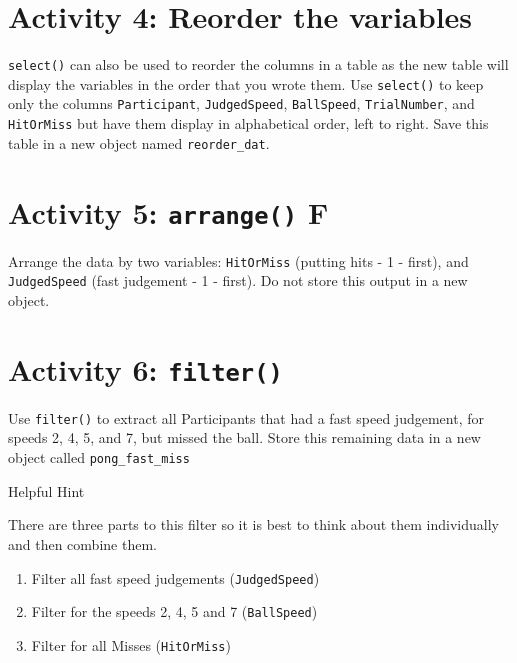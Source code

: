 \documentclass[]{book}
\begin{document}
\hypertarget{activity-4-reorder-the-variables}{%
\section{Activity 4: Reorder the variables}\label{activity-4-reorder-the-variables}}

\texttt{select()} can also be used to reorder the columns in a table as the new table will display the variables in the order that you wrote them. Use \texttt{select()} to keep only the columns \texttt{Participant}, \texttt{JudgedSpeed}, \texttt{BallSpeed}, \texttt{TrialNumber}, and \texttt{HitOrMiss} but have them display in alphabetical order, left to right. Save this table in a new object named \texttt{reorder\_dat}.

\hypertarget{activity-5-arrange-f}{%
\section{\texorpdfstring{Activity 5: \textbf{\texttt{arrange()}} F}{Activity 5: arrange() F}}\label{activity-5-arrange-f}}

Arrange the data by two variables: \texttt{HitOrMiss} (putting hits - 1 - first), and \texttt{JudgedSpeed} (fast judgement - 1 - first). Do not store this output in a new object.

\hypertarget{activity-6-filter}{%
\section{\texorpdfstring{Activity 6: \texttt{filter()}}{Activity 6: filter()}}\label{activity-6-filter}}

Use \texttt{filter()} to extract all Participants that had a fast speed judgement, for speeds 2, 4, 5, and 7, but missed the ball. Store this remaining data in a new object called \texttt{pong\_fast\_miss}

Helpful Hint

There are three parts to this filter so it is best to think about them individually and then combine them.

\begin{enumerate}
\def\labelenumi{\arabic{enumi}.}
\item
  Filter all fast speed judgements (\texttt{JudgedSpeed})
\item
  Filter for the speeds 2, 4, 5 and 7 (\texttt{BallSpeed})
\item
  Filter for all Misses (\texttt{HitOrMiss})
\end{enumerate}
\end{document}
